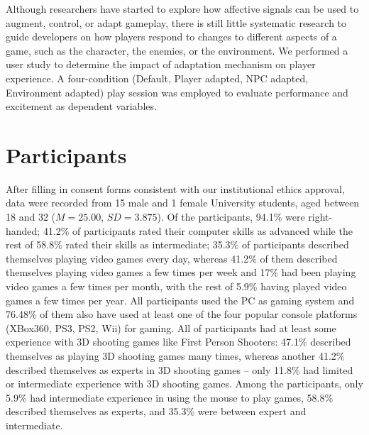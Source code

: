 
Although researchers have started to explore how affective signals can be used to augment, control, or adapt gameplay, there is still little systematic research to guide developers on how players respond to changes to different aspects of a game, such as the character, the enemies, or the environment. We performed a user study to determine the impact of adaptation mechanism on player experience. A four-condition (Default, Player adapted, NPC adapted, Environment adapted) play session was employed to evaluate performance and excitement as dependent variables.

\section{Participants}
After filling in consent forms consistent with our institutional ethics approval, data were recorded from 15 male and 1 female University students, aged between 18 and 32 ($M = 25.00$, $SD = 3.875$). Of the participants, 94.1\% were right-handed; 41.2\% of participants rated their computer skills as advanced while the rest of 58.8\% rated their skills as intermediate; 35.3\% of participants described themselves playing video games every day, whereas 41.2\% of them described themselves playing video games a few times per week and 17\% had been playing video games a few times per month, with the rest of 5.9\% having played video games a few times per year. All participants used the PC as gaming system and 76.48\% of them also have used at least one of the four popular console platforms (XBox360, PS3, PS2, Wii) for gaming. All of participants had at least some experience with 3D shooting games like First Person Shooters: 47.1\% described themselves as playing 3D shooting games many times, whereas another 41.2\% described themselves as experts in 3D shooting games – only 11.8\% had limited or intermediate experience with 3D shooting games. Among the participants, only 5.9\% had intermediate experience in using the mouse to play games, 58.8\% described themselves as experts, and 35.3\% were between expert and intermediate.

